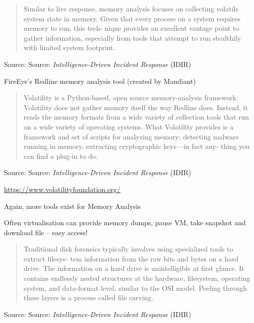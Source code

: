 \documentclass[Screen16to9,17pt]{foils}
\begin{document}



\begin{quote}
Similar to live response, memory analysis focuses on collecting volatile system state
in memory. Given that every process on a system requires memory to run, this tech‐
nique provides an excellent vantage point to gather information, especially from tools
that attempt to run stealthily with limited system footprint.
\end{quote}
Source: Source: \emph{Intelligence-Driven Incident Response} (IDIR)

\begin{list2}
\item FireEye’s Redline memory analysis tool (created by Mandiant)
\end{list2}



\begin{quote}
Volatility is a Python-based, open source memory-analysis framework. Volatility does
not gather memory itself the way Redline does. Instead, it reads the memory formats
from a wide variety of collection tools that run on a wide variety of operating systems.
What Volatility provides is a framework and set of scripts for analyzing memory;
detecting malware running in memory, extracting cryptographic keys—in fact any‐
thing you can find a plug-in to do.
\end{quote}
Source: Source: \emph{Intelligence-Driven Incident Response} (IDIR)

\begin{list2}
\item \url{https://www.volatilityfoundation.org/}
\item Again, more tools exist for Memory Analysis
\item Often virtualisation can provide memory dumps, pause VM, take snapshot and download file -- easy access!
\end{list2}




\begin{quote}
Traditional disk forensics typically involves using specialized tools to extract filesys‐
tem information from the raw bits and bytes on a hard drive. The information on a
hard drive is unintelligible at first glance. It contains endlessly nested structures at the
hardware, filesystem, operating system, and data-format level, similar to the OSI
model. Peeling through these layers is a process called file carving.
\end{quote}
Source: Source: \emph{Intelligence-Driven Incident Response} (IDIR)
\end{document}
